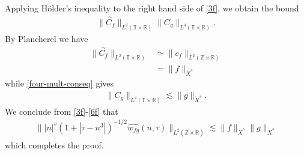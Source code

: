 \documentclass[12pt,reqno]{amsart}
\numberwithin{equation}{section}  %
\numberwithin{figure}{section}
\newcommand{\rr}{\mathbb{R}}
\newcommand{\zz}{\mathbb{Z}}
\newcommand{\ci}{\mathbb{T}}
\newcommand{\zzdot}{\dot{\zz}}
\newcommand{\wh}{\widehat}
\theoremstyle{plain}
\theoremstyle{definition}
\theoremstyle{remark}
\begin{document}
%
Applying H\"{o}lder's inequality to the right hand side of
\eqref{3f}, we obtain the bound
%
\begin{equation}
	\label{4f}
	\begin{split}
		\|\overset{\sim}{C_f} \|_{L^2(\ci \times \rr)} \|C_g \|_{L^4\left( \ci 
		\times \rr 
		\right)}. 
	\end{split}
\end{equation}
%
By Plancherel we have
%
%
\begin{equation}
	\label{5f}
	\begin{split}
		\|\overset{\sim}{C_f} \|_{L^2(\ci \times \rr)}
		& \simeq \|c_f\|_{L^2(\zz \times \rr)}
		\\
		& = \|f \|_{\dot{X}^s}
	\end{split}
\end{equation}
%
while \eqref{four-mult-conseq} gives
%
%
\begin{equation}
	\label{6f}
	\begin{split}
		\|C_g \|_{L^4(\ci \times \rr)} \lesssim \|g\|_{\dot{X}^s}.
	\end{split}
\end{equation}
%
%
We conclude from \eqref{3f}-\eqref{6f} that
%
%
\begin{equation*}
	\begin{split}
		\| |n|^s \left( 1 + | \tau - n^3 | \right)^{-1/2} \wh{w_{fg}}(n, \tau) 
		 \|_{L^2(\zzdot \times \rr)}
		 \lesssim \|f\|_{\dot{X}^s} \|g\|_{\dot{X}^s}
	\end{split}
\end{equation*}
%
%
which completes the proof.  \qquad \qedsymbol
%
%
\end{document}
